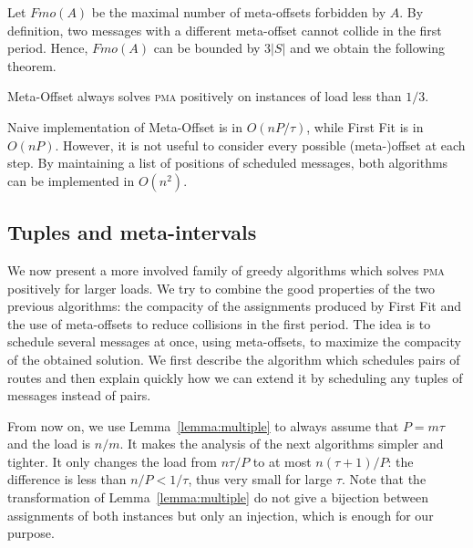 \documentclass[a4paper,UKenglish,cleveref, autoref, thm-restate]{lipics-v2019}
\newcommand\pma{\textsc{pma}\xspace}
\begin{document}
Let $Fmo(A)$ be the maximal number of meta-offsets forbidden by $A$. 
 By definition, two messages with a different meta-offset cannot collide in the first period.
Hence, $Fmo(A)$ can be bounded by $3|S|$ and we obtain the following theorem.


\begin{theorem}
Meta-Offset always solves \pma positively on instances of load less than $1/3$.
\end{theorem}

Naive implementation of Meta-Offset is in $O(n P/\tau)$, while First Fit is in $O(nP)$.
However, it is not useful to consider every possible (meta-)offset at each step. By maintaining
a list of positions of scheduled messages, both algorithms can be implemented in $O(n^2)$.

\subsection{Tuples and meta-intervals}

We now present a more involved family of greedy algorithms which 
solves \pma positively for larger loads. We try to combine the good properties of the two previous algorithms: the compacity of the assignments produced by First Fit and the use of meta-offsets to reduce collisions in the first period. The idea is to schedule several messages at once, using meta-offsets, to maximize the compacity of the obtained solution. 
We first describe the algorithm which schedules pairs of routes and then explain quickly how we can extend it by scheduling any tuples of messages instead of pairs.



From now on, we use Lemma~\ref{lemma:multiple} to always assume that $P = m\tau$ and the load is $n/m$. It makes the analysis of the next algorithms simpler and tighter. It only changes the load from $n \tau / P$ to at most $n (\tau +1)/ P$: the difference is less than $n /P < 1/\tau$, thus very small for large $\tau$. Note that the transformation of Lemma~\ref{lemma:multiple} do not give a bijection between assignments of both instances but only an injection, which is enough for our purpose. 
\end{document}
